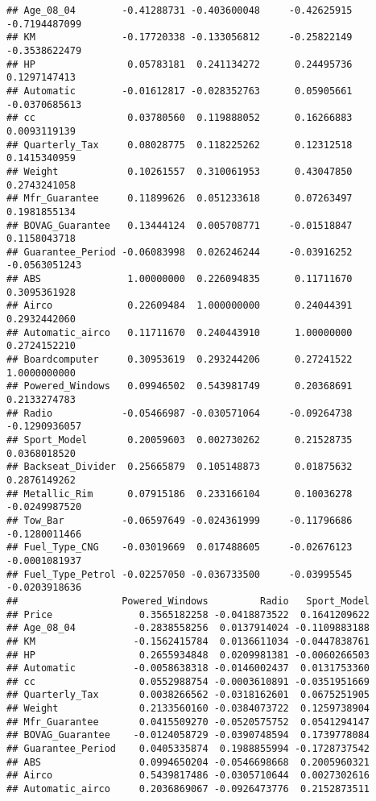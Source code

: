 \documentclass[]{article}
\begin{document}
\begin{verbatim}
## Age_08_04        -0.41288731 -0.403600048     -0.42625915 -0.7194487099
## KM               -0.17720338 -0.133056812     -0.25822149 -0.3538622479
## HP                0.05783181  0.241134272      0.24495736  0.1297147413
## Automatic        -0.01612817 -0.028352763      0.05905661 -0.0370685613
## cc                0.03780560  0.119888052      0.16266883  0.0093119139
## Quarterly_Tax     0.08028775  0.118225262      0.12312518  0.1415340959
## Weight            0.10261557  0.310061953      0.43047850  0.2743241058
## Mfr_Guarantee     0.11899626  0.051233618      0.07263497  0.1981855134
## BOVAG_Guarantee   0.13444124  0.005708771     -0.01518847  0.1158043718
## Guarantee_Period -0.06083998  0.026246244     -0.03916252 -0.0563051243
## ABS               1.00000000  0.226094835      0.11711670  0.3095361928
## Airco             0.22609484  1.000000000      0.24044391  0.2932442060
## Automatic_airco   0.11711670  0.240443910      1.00000000  0.2724152210
## Boardcomputer     0.30953619  0.293244206      0.27241522  1.0000000000
## Powered_Windows   0.09946502  0.543981749      0.20368691  0.2133274783
## Radio            -0.05466987 -0.030571064     -0.09264738 -0.1290936057
## Sport_Model       0.20059603  0.002730262      0.21528735  0.0368018520
## Backseat_Divider  0.25665879  0.105148873      0.01875632  0.2876149262
## Metallic_Rim      0.07915186  0.233166104      0.10036278 -0.0249987520
## Tow_Bar          -0.06597649 -0.024361999     -0.11796686 -0.1280011466
## Fuel_Type_CNG    -0.03019669  0.017488605     -0.02676123 -0.0001081937
## Fuel_Type_Petrol -0.02257050 -0.036733500     -0.03995545 -0.0203918636
##                  Powered_Windows         Radio   Sport_Model
## Price               0.3565182258 -0.0418873522  0.1641209622
## Age_08_04          -0.2838558256  0.0137914024 -0.1109883188
## KM                 -0.1562415784  0.0136611034 -0.0447838761
## HP                  0.2655934848  0.0209981381 -0.0060266503
## Automatic          -0.0058638318 -0.0146002437  0.0131753360
## cc                  0.0552988754 -0.0003610891 -0.0351951669
## Quarterly_Tax       0.0038266562 -0.0318162601  0.0675251905
## Weight              0.2133560160 -0.0384073722  0.1259738904
## Mfr_Guarantee       0.0415509270 -0.0520575752  0.0541294147
## BOVAG_Guarantee    -0.0124058729 -0.0390748594  0.1739778084
## Guarantee_Period    0.0405335874  0.1988855994 -0.1728737542
## ABS                 0.0994650204 -0.0546698668  0.2005960321
## Airco               0.5439817486 -0.0305710644  0.0027302616
## Automatic_airco     0.2036869067 -0.0926473776  0.2152873511

\end{verbatim}
\end{document}
